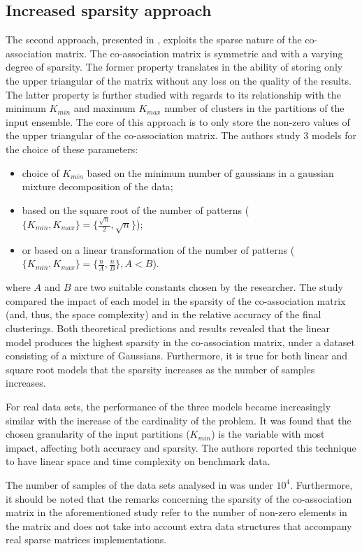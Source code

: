 \subsection{Increased sparsity approach}
The second approach, presented in \cite{Lourenco2010}, exploits the sparse nature of the co-association matrix.
The co-association matrix is symmetric and with a varying degree of sparsity.
The former property translates in the ability of storing only the upper triangular of the matrix without any loss on the quality of the results.
The latter property is further studied with regards to its relationship with the minimum $K_{min}$ and maximum $K_{max}$ number of clusters in the partitions of the input ensemble.
The core of this approach is to only store the non-zero values of the upper triangular of the co-association matrix.
The authors study 3 models for the choice of these parameters:

\begin{itemize}
	\item choice of $K_{min}$ based on the minimum number of gaussians in a gaussian mixture decomposition of the data;
	\item based on the square root of the number of patterns ($\{K_{min},K_{max}\} = \{\frac{\sqrt{n}}{2},\sqrt{n}\}$);
	\item or based on a linear transformation of the number of patterns ($\{K_{min},K_{max}\} = \{\frac{n}{A},\frac{n}{B}\},A<B$).
\end{itemize}

where $A$ and $B$ are two suitable constants chosen by the researcher.
The study compared the impact of each model in the sparsity of the co-association matrix (and, thus, the space complexity) and in the relative accuracy of the final clusterings.
Both theoretical predictions and results revealed that the linear model produces the highest sparsity in the co-association matrix, under a dataset consisting of a mixture of Gaussians.
Furthermore, it is true for both linear and square root models that the sparsity increases as the number of samples increases.

For real data sets, the performance of the three models became increasingly similar with the increase of the cardinality of the problem.
It was found that the chosen granularity of the input partitions ($K_{min}$) is the variable with most impact, affecting both accuracy and sparsity.
The authors reported this technique to have linear space and time complexity on benchmark data.

The number of samples of the data sets analysed in \cite{Lourenco2010} was under $10^4$.
Furthermore, it should be noted that the remarks concerning the sparsity of the co-association matrix in the aforementioned study refer to the number of non-zero elements in the matrix and does not take into account extra data structures that accompany real sparse matrices implementations.

